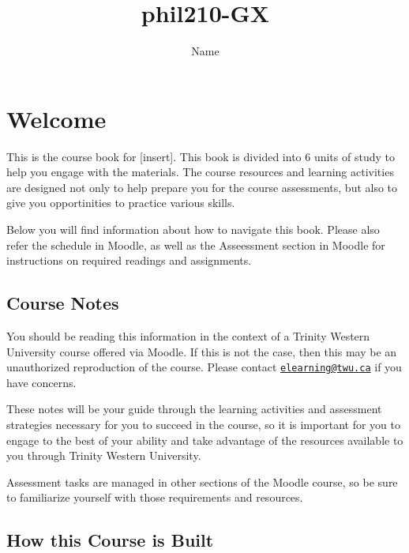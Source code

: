 \documentclass[
]{book}
\title{phil210-GX}
\author{Name}
\date{}
\begin{document}
\maketitle

{
\setcounter{tocdepth}{1}
\tableofcontents
}
\hypertarget{welcome}{%
\chapter*{Welcome}\label{welcome}}

This is the course book for {[}insert{]}. This book is divided into 6 units of study to help you engage with the materials. The course resources and learning activities are designed not only to help prepare you for the course assessments, but also to give you opportinities to practice various skills.

Below you will find information about how to navigate this book. Please also refer the schedule in Moodle, as well as the Asseessment section in Moodle for instructions on required readings and assignments.

\hypertarget{course-notes}{%
\section*{Course Notes}\label{course-notes}}

You should be reading this information in the context of a Trinity Western University course offered via Moodle. If this is not the case, then this may be an unauthorized reproduction of the course. Please contact \href{mailto:elearning@twu.ca}{\nolinkurl{elearning@twu.ca}} if you have concerns.

These notes will be your guide through the learning activities and assessment strategies necessary for you to succeed in the course, so it is important for you to engage to the best of your ability and take advantage of the resources available to you through Trinity Western University.

Assessment tasks are managed in other sections of the Moodle course, so be sure to familiarize yourself with those requirements and resources.

\hypertarget{how-this-course-is-built}{%
\section*{How this Course is Built}\label{how-this-course-is-built}}
\end{document}
